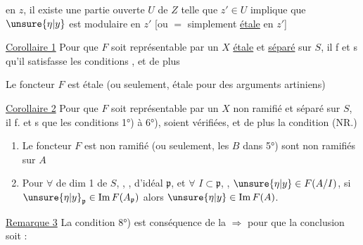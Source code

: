 en $z$, il existe une partie ouverte   $U$ de $Z$ telle que $z'\in U$ implique que $\unsure{\eta|y}$ est  modulaire en $z'$ [ou $=$ simplement \uline{étale} en $z'$]


\uline{Corollaire 1} Pour que $F$ soit représentable par un $X$ \uline{étale} et \uline{séparé} sur $S$, il f et s qu'il satisfasse les conditions  , et de plus

 Le foncteur $F$ est étale (ou seulement, étale pour des arguments artiniens) 


\uline{Corollaire 2} Pour que $F$ soit représentable par un $X$ non ramifié et séparé sur $S$, il f. et s que les conditions 1°) à 6°),   soient vérifiées, et de plus la condition  (NR.) 

\begin{enumerate}
\item[a)] Le foncteur $F$ est non ramifié (ou seulement, les $B$ dans 5°) sont non ramifiés sur $A$
\item[\textcircled{b}] Pour $\forall$     de dim 1  de $S$, , , d'idéal   $\mathfrak p$, et $\forall$   $I\subset\mathfrak p$, , $\unsure{\eta|y}\in F(A/I)$, si $\unsure{\eta|y}_{\mathfrak p}\in\operatorname{Im}F(A_{\mathfrak p})$ alors $\unsure{\eta|y}\in\operatorname{Im}F(A)$.
\end{enumerate}

\margin{[Exprimer 8° ici par une impossibilité \uline{générique} de prolonger \ldots}

\uline{Remarque 3} La condition 8°) est conséquence de la  $\Rightarrow$  pour que la conclusion soit :

